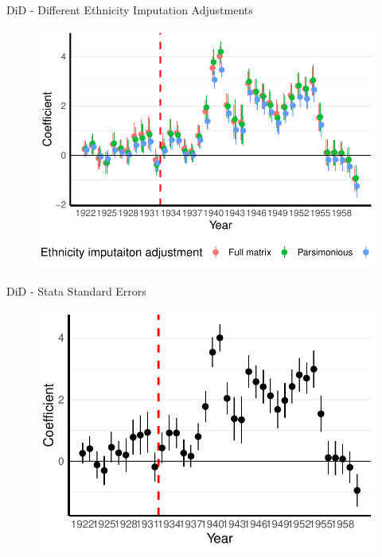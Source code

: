 \documentclass[11pt]{beamer}
\begin{document}
\begin{frame}[label=did_pred_adj]{DiD - Different Ethnicity Imputation Adjustments}
 \begin{figure}[h]
\centering
\includegraphics[width=1\textwidth]{pred_adj_comp_pred_full_imp_date_cr2.pdf}
\end{figure}
\hyperlink{robustness_checks}{}
\end{frame}


\begin{frame}[label=did_stata_se]{DiD - Stata Standard Errors}
 \begin{figure}[h]
\centering
\includegraphics[width=1\textwidth]{fmla_pred_full_imp_date_no_trends_geopol_stata_SE.pdf}
\end{figure}
\hyperlink{robustness_checks}{}
\end{frame}
\end{document}
